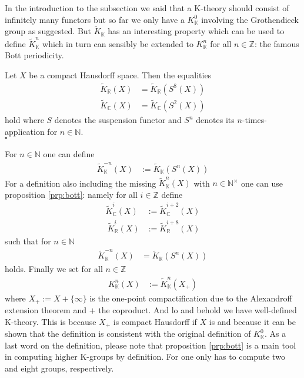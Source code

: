 In the introduction to the subsection we said that a K-theory should consist of infinitely many functors but so far we only have a $K_{\mathbb{K}}^{0}$ involving the Grothendieck group as suggested. But $\tilde{K}_{\mathbb{K}}$ has an interesting property which can be used to define $\tilde{K}_{\mathbb{K}}^{n}$ which in turn can sensibly be extended to $K_{\mathbb{K}}^{n}$ for all $n \in \mathbb{Z}$: the famous Bott periodicity.
\\
\begin{prp}
\label{prp:bott}
Let $X$ be a compact Hausdorff space. Then the equalities
\begin{align*}
  \tilde{K}_{\mathbb{R}}(X)
  &=
  \tilde{K}_{\mathbb{R}}(S^{8}(X))
  \\
  \tilde{K}_{\mathbb{C}}(X)
  &=
  \tilde{K}_{\mathbb{C}}(S^{2}(X))
\end{align*} hold where $S$ denotes the suspension functor and $S^{n}$ denotes its $n$-times-application for $n \in \mathbb{N}$.
\\
\phantom{proven}
\hfill
$\square$
\end{prp}
For $n \in \mathbb{N}$ one can define
\begin{align*}
  \tilde{K}_{\mathbb{K}}^{-n}(X)
  &:=
  \tilde{K}_{\mathbb{K}}(S^{n}(X))
\end{align*}
For a definition also including the missing $\tilde{K}_{\mathbb{K}}^{n}(X)$ with $n \in \mathbb{N}^{\times}$ one can use proposition \ref{prp:bott}: namely for all $i \in \mathbb{Z}$ define
\begin{align*}
  \tilde{K}_{\mathbb{C}}^{i}(X)
  &:=
  \tilde{K}_{\mathbb{C}}^{i+2}(X)
  \\\
  \tilde{K}_{\mathbb{R}}^{i}(X)
  &:=
  \tilde{K}_{\mathbb{R}}^{i+8}(X)
\end{align*}
such that for $n \in \mathbb{N}$ 
\begin{align*}
  \tilde{K}_{\mathbb{K}}^{-n}(X)
  &=
  \tilde{K}_{\mathbb{K}}(S^{n}(X))
\end{align*}
holds. Finally we set for all $n \in \mathbb{Z}$
\begin{align*}
  K_{\mathbb{K}}^{n}(X)
  &:=
  \tilde{K}_{\mathbb{K}}^{n}(X_{+})
\end{align*}
where $X_{+} := X + \lbrace \infty \rbrace$ is the one-point compactification due to the Alexandroff extension theorem and $+$ the coproduct. And lo and behold we have well-defined K-theory. This is because $X_{+}$ is compact Hausdorff if $X$ is and because it can be shown that the definition is consistent with the original definition of $K_{\mathbb{K}}^{0}$. As a last word on the definition, please note that proposition \ref{prp:bott} is a main tool in computing higher K-groups by definition. For one only has to compute two and eight groups, respectively.
